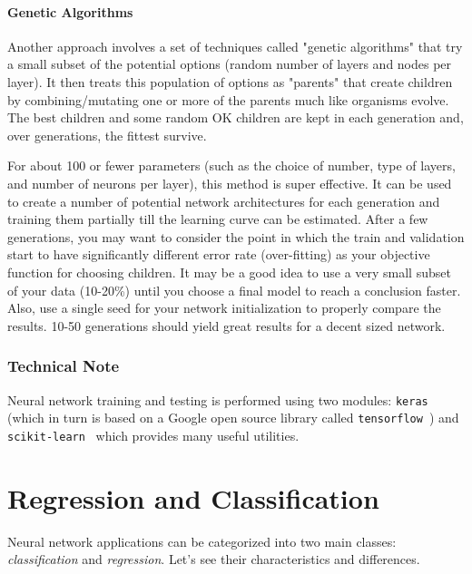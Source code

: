 \paragraph{Genetic Algorithms}

Another approach involves a set of techniques called "genetic algorithms" that try a small subset of the potential options (random number of layers and nodes per layer). It then treats this population of options as "parents" that create children by combining/mutating one or more of the parents much like organisms evolve. The best children and some random OK children are kept in each generation and, over generations, the fittest survive.

For about 100 or fewer parameters (such as the choice of number, type of layers, and number of neurons per layer), this method is super effective. It can be used to create a number of potential network architectures for each generation and training them partially till the learning curve can be estimated. After a few generations, you may want to consider the point in which the train and validation start to have significantly different error rate (over-fitting) as your objective function for choosing children. It may be a good idea to use a very small subset of your data (10-20\%) until you choose a final model to reach a conclusion faster. Also, use a single seed for your network initialization to properly compare the results. 10-50 generations should yield great results for a decent sized network.

\begin{attention}
\subsubsection{Technical Note}
\label{technical-note}

Neural network training and testing is performed using two modules: \texttt{keras}~\cite{bib:keras} (which in turn is based on a Google open source library called \texttt{tensorflow}~\cite{bib:tensorflow}) and \texttt{scikit-learn}~\cite{bib:scikit} which provides many useful utilities.
\end{attention}

\section{Regression and Classification}
\label{regression-and-classification}

Neural network applications can be categorized into two main classes: \emph{classification} and \emph{regression}. Let's see their characteristics and differences.

